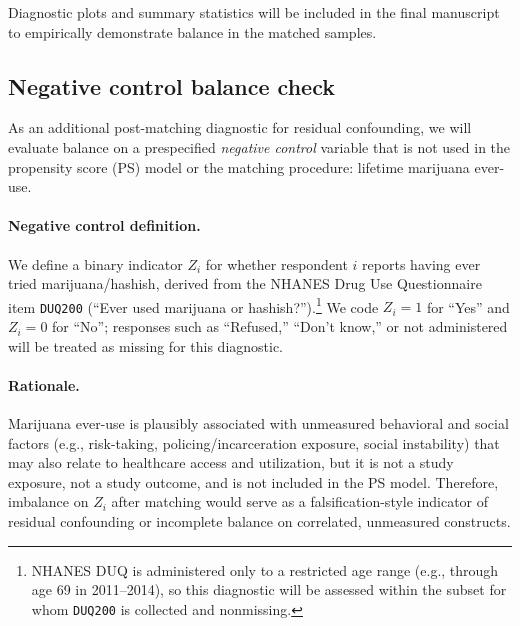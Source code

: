 \documentclass{article}
\begin{document}
Diagnostic plots and summary statistics will be included in the final manuscript to empirically demonstrate balance in the matched samples.

\subsection{Negative control balance check}
\label{sec:neg-control}

As an additional post-matching diagnostic for residual confounding, we will evaluate balance on a prespecified \emph{negative control} variable that is not used in the propensity score (PS) model or the matching procedure: lifetime marijuana ever-use.

\paragraph{Negative control definition.}
We define a binary indicator $Z_i$ for whether respondent $i$ reports having ever tried marijuana/hashish, derived from the NHANES Drug Use Questionnaire item \texttt{DUQ200} (``Ever used marijuana or hashish?'').\footnote{NHANES DUQ is administered only to a restricted age range (e.g., through age 69 in 2011--2014), so this diagnostic will be assessed within the subset for whom \texttt{DUQ200} is collected and nonmissing.} We code $Z_i=1$ for ``Yes'' and $Z_i=0$ for ``No''; responses such as ``Refused,'' ``Don't know,'' or not administered will be treated as missing for this diagnostic.

\paragraph{Rationale.}
Marijuana ever-use is plausibly associated with unmeasured behavioral and social factors (e.g., risk-taking, policing/incarceration exposure, social instability) that may also relate to healthcare access and utilization, but it is not a study exposure, not a study outcome, and is not included in the PS model. Therefore, imbalance on $Z_i$ after matching would serve as a falsification-style indicator of residual confounding or incomplete balance on correlated, unmeasured constructs.
\end{document}
